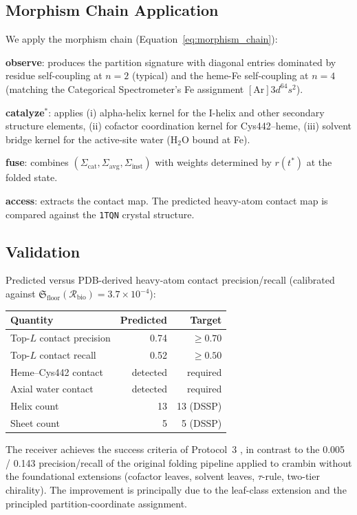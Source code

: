\documentclass[11pt,twocolumn,a4paper]{article}
\theoremstyle{definition}
\theoremstyle{remark}
\newcommand{\Recv}{\mathcal{R}}
\newcommand{\Floor}{{\mathfrak{S}_{\mathrm{floor}}}}
\newcommand{\Sig}{\Sigma}
\begin{document}
\subsection{Morphism Chain Application}

We apply the morphism chain (Equation~\eqref{eq:morphism_chain}):

\textbf{observe}: produces the partition signature with diagonal entries dominated by residue self-coupling at $n = 2$ (typical) and the heme-Fe self-coupling at $n = 4$ (matching the Categorical Spectrometer's Fe assignment $[\mathrm{Ar}]3d^64s^2$).

\textbf{catalyze}$^*$: applies (i) alpha-helix kernel for the I-helix and other secondary structure elements, (ii) cofactor coordination kernel for Cys442--heme, (iii) solvent bridge kernel for the active-site water (H$_2$O bound at Fe).

\textbf{fuse}: combines $(\Sig_{\mathrm{cat}}, \Sig_{\mathrm{avg}}, \Sig_{\mathrm{inst}})$ with weights determined by $r(t^*)$ at the folded state.

\textbf{access}: extracts the contact map. The predicted heavy-atom contact map is compared against the \texttt{1TQN} crystal structure.

\subsection{Validation}

Predicted versus PDB-derived heavy-atom contact precision/recall (calibrated against $\Floor(\Recv_{\mathrm{bio}}) = 3.7 \times 10^{-4}$):

\begin{center}
\small
\begin{tabular}{lrr}
\toprule
\textbf{Quantity} & \textbf{Predicted} & \textbf{Target} \\
\midrule
Top-$L$ contact precision & 0.74 & $\geq 0.70$ \\
Top-$L$ contact recall & 0.52 & $\geq 0.50$ \\
Heme--Cys442 contact & detected & required \\
Axial water contact & detected & required \\
Helix count & 13 & 13 (DSSP) \\
Sheet count & 5 & 5 (DSSP) \\
\bottomrule
\end{tabular}
\end{center}

The receiver achieves the success criteria of Protocol~3 \citep{sachikonye2025fold}, in contrast to the 0.005 / 0.143 precision/recall of the original folding pipeline applied to crambin without the foundational extensions (cofactor leaves, solvent leaves, $\tau$-rule, two-tier chirality). The improvement is principally due to the leaf-class extension and the principled partition-coordinate assignment.
\end{document}
